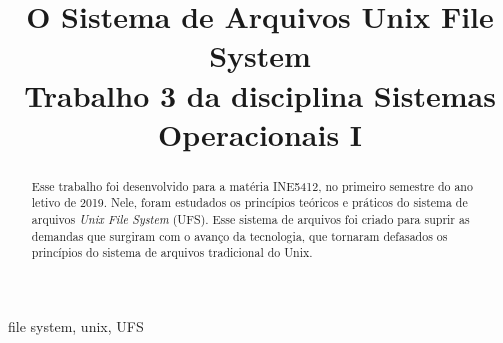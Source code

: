 \documentclass[conference]{IEEEtran}
\begin{document}
\title{O Sistema de Arquivos Unix File System\\
{\footnotesize \textsuperscript{}Trabalho 3 da disciplina Sistemas Operacionais I}
}

\author{
\and
{}

}

\maketitle

\begin{abstract}
Esse trabalho foi desenvolvido para a matéria INE5412, no primeiro semestre do ano letivo de 2019. Nele, foram estudados os princípios teóricos e práticos do sistema de arquivos \textit{Unix File System} (UFS). Esse sistema de arquivos foi criado para suprir as demandas que surgiram com o avanço da tecnologia, que tornaram defasados os princípios do sistema de arquivos tradicional do Unix. 
\end{abstract}

\begin{IEEEkeywords}
file system, unix, UFS
\end{IEEEkeywords}







\end{document}
